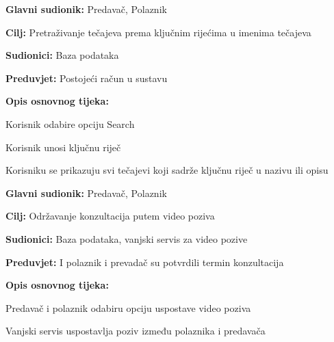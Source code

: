 				\begin{packed_item}
					
					\item \textbf{Glavni sudionik:} Predavač, Polaznik
					\item  \textbf{Cilj:} Pretraživanje tečajeva prema ključnim rijećima u imenima tečajeva
					\item  \textbf{Sudionici:} Baza podataka
					\item  \textbf{Preduvjet:} Postojeći račun u sustavu
					\item  \textbf{Opis osnovnog tijeka:}
					
					\item[] \begin{packed_enum}
						
						\item Korisnik odabire opciju Search
						\item Korisnik unosi ključnu riječ
						\item Korisniku se prikazuju svi tečajevi koji sadrže ključnu riječ u nazivu ili opisu 
						
					\end{packed_enum}
					

				\end{packed_item}
			\noindent \underbar{\textbf{UC17 - Video poziv}}
			\begin{packed_item}
				
				\item \textbf{Glavni sudionik:} Predavač, Polaznik
				\item  \textbf{Cilj:} Održavanje konzultacija putem video poziva 
				\item  \textbf{Sudionici:} Baza podataka, vanjski servis za video pozive
				\item  \textbf{Preduvjet:} I polaznik i prevadač su potvrdili termin konzultacija
				\item  \textbf{Opis osnovnog tijeka:}
				
				\item[] \begin{packed_enum}
					
					\item Predavač i polaznik odabiru opciju uspostave video poziva
					\item Vanjski servis uspostavlja poziv između polaznika i predavača
					
				\end{packed_enum}
				
				
			\end{packed_item}
			\eject
		
